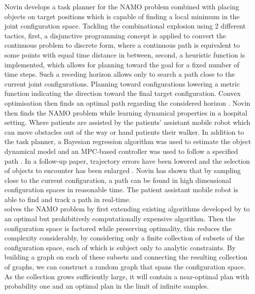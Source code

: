 Novin \cite{sabbagh_novin_optimal_2016} develops a task planner for the \ac{NAMO} problem combined with placing objects on target positions which is capable of finding a local minimum in the joint configuration space. Tackling the combinational explosion using 2 different tactics, first, a disjunctive programming concept is applied to convert the continuous problem to discrete form, where a continuous path is equivalent to some points with equal time distance in between, second, a heuristic function is implemented, which allows for planning toward the goal for a fixed number of time steps. Such a receding horizon allows only to search a path close to the current joint configurations. Planning toward configurations lowering a metric function indicating the direction toward the final target configuration. Convex optimisation then finds an optimal path regarding the considered horizon \cite{sabbagh_novin_optimal_2016}. Novin then finds the \ac{NAMO} problem while learning dynamical properties in a hospital setting. Where patients are assisted by the patients' assistant mobile robot which can move obstacles out of the way or hand patients their walker. In addition to the task planner, a Bayesian regression algorithm was used to estimate the object dynamical model and an \ac{MPC}-based controller was used to follow a specified path \cite{novin_dynamic_2018}. In a follow-up paper, trajectory errors have been lowered and the selection of objects to encounter has been enlarged \cite{sabbagh_novin_model_2021}. Novin has shown that by sampling close to the current configuration, a path can be found in high dimensional configuration spaces in reasonable time. The patient assistant mobile robot is able to find and track a path in real-time.\\

\cite{goldberg_asymptotically_2020} solves the \ac{NAMO} problem by first extending existing algorithms developed by \cite{hauser_randomized_2011} to an optimal but prohibitively computationally expensive algorithm. Then the configuration space is factored while preserving optimality, this reduces the complexity considerably, by considering only a finite collection of subsets of the configuration space, each of which is subject only to analytic constraints. By building a graph on each of these subsets and connecting the resulting collection of graphs, we can construct a random graph that spans the configuration space. As the collection grows sufficiently large, it will contain a near-optimal plan with probability one and an optimal plan in the limit of infinite samples. \\

